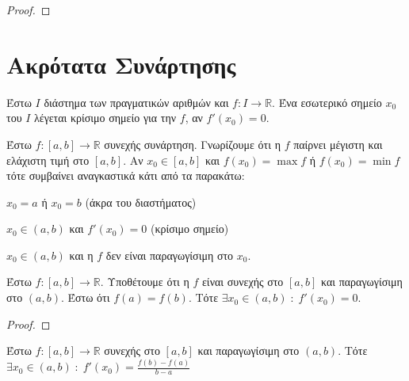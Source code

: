 \documentclass[main.tex]{subfiles}
\begin{document}
\begin{proof}
    
\end{proof}

\section{Ακρότατα Συνάρτησης}

\begin{dfn}
    Έστω $I$ διάστημα των πραγματικών αριθμών και $ f \colon I \to \mathbb{R} $. 
    Ένα εσωτερικό σημείο $ x_{0} $ του $I$ λέγεται κρίσιμο σημείο για την $f$, αν 
    $ f'(x_{0} ) = 0 $.
\end{dfn}

\begin{rem}
    Έστω $ f \colon [a,b] \to \mathbb{R} $ συνεχής συνάρτηση. Γνωρίζουμε ότι η $f$ 
    παίρνει μέγιστη και ελάχιστη τιμή στο $ [a,b] $. Αν $ x_{0} \in [a,b] $ και 
    $ f(x_{0}) = \max f $ ή $ f(x_{0}) = \min f $ τότε συμβαίνει αναγκαστικά 
    κάτι από τα παρακάτω:
    \begin{myitemize}
    \item $ x_{0} = a $ ή $ x_{0} =b $ (άκρα του διαστήματος)
    \item $ x_{0} \in (a,b) $ και $ f'(x_{0} ) = 0 $ (κρίσιμο σημείο)
    \item $ x_{0} \in (a,b) $ και η $f$ δεν είναι παραγωγίσιμη στο $ x_{0} $.
    \end{myitemize}
\end{rem}

\begin{examples}
\end{examples}

\begin{thm}[Rolle]
    Έστω $ f \colon [a,b] \to \mathbb{R} $. Υποθέτουμε ότι η $ f $ είναι συνεχής 
    στο $ [a,b] $ και παραγωγίσιμη στο $ (a,b) $. Έστω ότι $ f(a)=f(b) $. Τότε
    $ \exists x_{0} \in (a,b) \; : \; f'(x_{0}) = 0 $.
\end{thm}

\begin{proof}

\end{proof}

\begin{thm}
    Έστω $ f \colon [a,b] \to \mathbb{R} $ συνεχής στο $ [a,b] $ και παραγωγίσιμη 
    στο $ (a,b) $. Τότε $ \exists x_{0} \in (a,b) \; : \; f'(x_{0}) = 
    \frac{f(b)-f(a)}{b-a} $
\end{thm}
\end{document}
